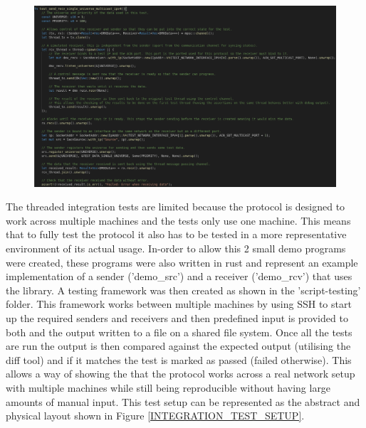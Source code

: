 \documentclass[11pt,a4paper]{report}
\begin{document}
\begin{figure}[H]
	\label{UNIT_INTEGRATION_TEST}
	\includegraphics[width=\textwidth]{integration-test-example.png}
	\caption{}
\end{figure}

The threaded integration tests are limited because the protocol is designed to work across multiple machines and the tests only use one machine. This means that to fully test the protocol it also has to be tested in a more representative environment of its actual usage. In-order to allow this 2 small demo programs were created, these programs were also written in rust and represent an example implementation of a sender ('demo\_src') and a receiver ('demo\_rcv') that uses the library. A testing framework was then created as shown in the 'script-testing' folder. This framework works between multiple machines by using SSH to start up the required senders and receivers and then predefined input is provided to both and the output written to a file on a shared file system. Once all the tests are run the output is then compared against the expected output (utilising the diff tool) and if it matches the test is marked as passed (failed otherwise). This allows a way of showing the that the protocol works across a real network setup with multiple machines while still being reproducible without having large amounts of manual input. This test setup can be represented as the abstract and physical layout shown in Figure \ref{INTEGRATION_TEST_SETUP}.
\end{document}

